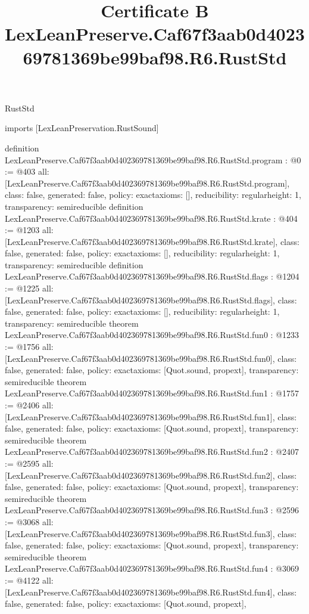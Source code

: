 \begin{lexlean}{RustStd}
\title{Certificate B LexLeanPreserve.Caf67f3aab0d402369781369be99baf98.R6.RustStd}
\begin{coremodule}
imports [LexLeanPreservation.RustSound]

definition LexLeanPreserve.Caf67f3aab0d402369781369be99baf98.R6.RustStd.program : @0 := @403 {
  all: [LexLeanPreserve.Caf67f3aab0d402369781369be99baf98.R6.RustStd.program],
  class: false,
  generated: false,
  policy: exact{axioms: []},
  reducibility: regular{height: 1},
  transparency: semireducible
}
definition LexLeanPreserve.Caf67f3aab0d402369781369be99baf98.R6.RustStd.krate : @404 := @1203 {
  all: [LexLeanPreserve.Caf67f3aab0d402369781369be99baf98.R6.RustStd.krate],
  class: false,
  generated: false,
  policy: exact{axioms: []},
  reducibility: regular{height: 1},
  transparency: semireducible
}
definition LexLeanPreserve.Caf67f3aab0d402369781369be99baf98.R6.RustStd.flags : @1204 := @1225 {
  all: [LexLeanPreserve.Caf67f3aab0d402369781369be99baf98.R6.RustStd.flags],
  class: false,
  generated: false,
  policy: exact{axioms: []},
  reducibility: regular{height: 1},
  transparency: semireducible
}
theorem LexLeanPreserve.Caf67f3aab0d402369781369be99baf98.R6.RustStd.fun0 : @1233 := @1756 {
  all: [LexLeanPreserve.Caf67f3aab0d402369781369be99baf98.R6.RustStd.fun0],
  class: false,
  generated: false,
  policy: exact{axioms: [Quot.sound, propext]},
  transparency: semireducible
}
theorem LexLeanPreserve.Caf67f3aab0d402369781369be99baf98.R6.RustStd.fun1 : @1757 := @2406 {
  all: [LexLeanPreserve.Caf67f3aab0d402369781369be99baf98.R6.RustStd.fun1],
  class: false,
  generated: false,
  policy: exact{axioms: [Quot.sound, propext]},
  transparency: semireducible
}
theorem LexLeanPreserve.Caf67f3aab0d402369781369be99baf98.R6.RustStd.fun2 : @2407 := @2595 {
  all: [LexLeanPreserve.Caf67f3aab0d402369781369be99baf98.R6.RustStd.fun2],
  class: false,
  generated: false,
  policy: exact{axioms: [Quot.sound, propext]},
  transparency: semireducible
}
theorem LexLeanPreserve.Caf67f3aab0d402369781369be99baf98.R6.RustStd.fun3 : @2596 := @3068 {
  all: [LexLeanPreserve.Caf67f3aab0d402369781369be99baf98.R6.RustStd.fun3],
  class: false,
  generated: false,
  policy: exact{axioms: [Quot.sound, propext]},
  transparency: semireducible
}
theorem LexLeanPreserve.Caf67f3aab0d402369781369be99baf98.R6.RustStd.fun4 : @3069 := @4122 {
  all: [LexLeanPreserve.Caf67f3aab0d402369781369be99baf98.R6.RustStd.fun4],
  class: false,
  generated: false,
  policy: exact{axioms: [Quot.sound, propext]},
}
\end{coremodule}
\end{lexlean}
